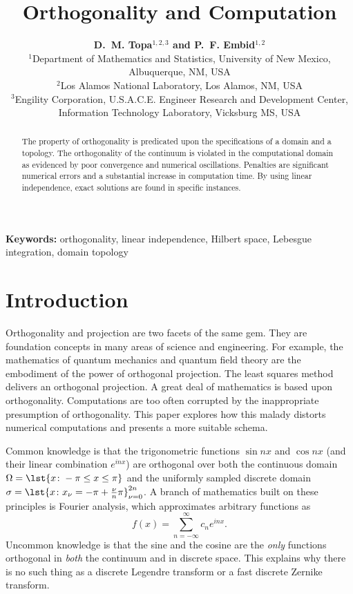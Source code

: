 \documentclass[conference]{worldcomp}
\title{\bf Orthogonality and Computation}
\author{
{\bfseries D.~M. Topa$^{1,2,3}$ and P.~F. Embid$^{1,2}$}\\
$^1$Department of Mathematics and Statistics, University of New Mexico, Albuquerque, NM, USA\\
$^2$Los Alamos National Laboratory, Los Alamos, NM, USA\\
$^3$Engility Corporation, U.S.A.C.E. Engineer Research and Development Center, \\
Information Technology Laboratory, Vicksburg MS, USA\\
}
\begin{document}
\maketitle 

\begin{abstract}
The property of orthogonality is predicated upon the specifications of a domain and a topology. The orthogonality of the continuum is violated in the computational domain as evidenced by poor convergence and numerical oscillations.
Penalties are significant numerical errors and a substantial increase in computation time. By using linear independence, exact solutions are found in specific instances.
\end{abstract}

\vspace{1em}
\noindent\textbf{Keywords:}
 {\small  orthogonality, linear independence, Hilbert space, Lebesgue integration, domain topology } 

\section{Introduction}
Orthogonality and projection are two facets of the same gem. They are foundation concepts in many areas of science and engineering. For example, the  mathematics of quantum mechanics and quantum field theory are the embodiment of the power of orthogonal projection. The least squares method delivers an orthogonal projection. A great deal of mathematics is based upon orthogonality. Computations are too often corrupted by the inappropriate presumption of orthogonality. This paper explores how this malady distorts numerical computations and presents a more suitable schema.

Common knowledge is that the trigonometric functions $\sin n x$ and $\cos n x$ (and their linear combination $e^{inx}$) are orthogonal over both the continuous domain $\Omega=\lst{x\colon -\pi \le x \le \pi}$ and the uniformly sampled discrete domain $\sigma=\lst{x\colon x_{\nu} = -\pi + \frac{\nu}{n}\pi}_{\nu=0}^{2n}$. A branch of mathematics built on these principles is  Fourier analysis, which approximates arbitrary functions as
$$f(x) = \sum_{n=-\infty}^{\infty} c_{n} e^{inx} .$$
Uncommon knowledge is that the sine and the cosine are the \emph{only} functions orthogonal in \emph{both} the continuum and in discrete space. This explains why there is no such thing as a discrete Legendre transform or a fast discrete Zernike transform.
\end{document}

